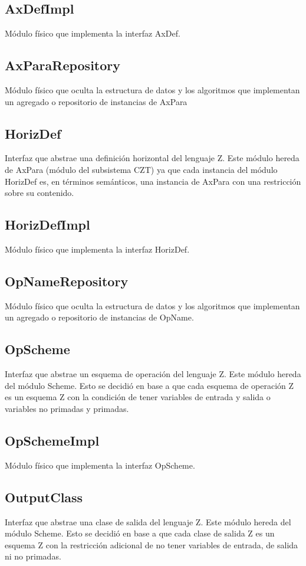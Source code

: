 \documentclass[a4paper,10pt]{report}
\begin{document}
		\subsection{AxDefImpl}
		Módulo físico que implementa la interfaz AxDef.
		\subsection{AxParaRepository}
		Módulo físico que oculta la estructura de datos y los algoritmos que implementan un agregado o repositorio de instancias de AxPara
		\subsection{HorizDef}
		Interfaz que abstrae una definición horizontal del lenguaje Z. Este módulo hereda de AxPara (módulo del subsistema CZT) ya que cada instancia del módulo HorizDef es, en términos semánticos, una instancia de AxPara con una restricción sobre su contenido.
		\subsection{HorizDefImpl}
		Módulo físico que implementa la interfaz HorizDef.
		\subsection{OpNameRepository}
		Módulo físico que oculta la estructura de datos y los algoritmos que implementan un agregado o repositorio de instancias de OpName.
		\subsection{OpScheme}
		Interfaz que abstrae un esquema de operación del lenguaje Z. Este módulo hereda del módulo Scheme. Esto se decidió en base a que cada esquema de operación Z es un esquema Z con la condición de tener variables de entrada y salida o variables no primadas y primadas.
		\subsection{OpSchemeImpl}
		Módulo físico que implementa la interfaz OpScheme.
		\subsection{OutputClass}
		Interfaz que abstrae una clase de salida del lenguaje Z. Este módulo hereda del módulo Scheme. Esto se decidió en base a que cada clase de salida Z es un esquema Z con la restricción adicional de no tener variables de entrada, de salida ni no primadas.
\end{document}

